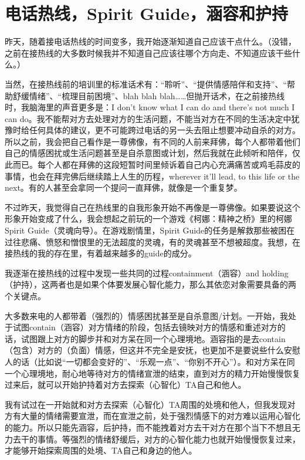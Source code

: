 \chapter{电话热线，Spirit Guide，涵容和护持}


昨天，随着接电话热线的时间变多，我开始逐渐知道自己应该干点什么。（没错，之前在接热线的大多数时候我并不知道自己应该往哪个方向走、不知道应该干些什么。）

当然，在接热线前的培训里的标准话术有：“聆听”、“提供情感陪伴和支持”、“帮助舒缓情绪”、“梳理目前困境”、blah blah blah……但抛开话术，在之前接热线时，我脑海里的声音更多是：I don't know what I can do and there's not much I can do。我不能帮对方去处理对方的生活问题，不能当对方在不同的生活决定中犹豫时给任何具体的建议，更不可能跨过电话的另一头去阻止想要冲动自杀的对方。所以之前，我会把自己看作是一尊佛像，有不同的人前来拜佛，每个人都带着他们自己的情感困扰或生活问题甚至是自杀意图或计划，然后我就在此倾听和陪伴，仅此而已。每个人都在拜佛的这段短暂时间里倾诉着自己内心充满痛苦或鸡毛蒜皮的事情，也会在拜完佛后继续踏上人生的历程，wherever it'll lead, to this life or the next。有的人甚至会拿同一个提问一直拜佛，就像是一个重复梦。

不过昨天，我觉得自己在热线里的自我形象开始不再像是一尊佛像。如果要说这个形象开始变成了什么，我会想起之前玩的一个游戏《柯娜：精神之桥》里的柯娜\pozhehao{}Spirit Guide（灵魂向导）。在游戏剧情里，Spirit Guide的任务是解救那些被困在过往悲痛、愤怒和憎恨里的无法超度的灵魂，有的灵魂甚至不想被超度。我想，在接热线的我的存在里，有着越来越多的guide的成分。

我逐渐在接热线的过程中发现一些共同的过程\pozhehao{}containment（涵容）and holding（护持），这两者也是如果个体要发展心智化能力，那么其依恋对象需要具备的两个关键点。

大多数来电的人都带着（强烈的）情感困扰甚至是自杀意图/计划。一开始，我处于试图contain（涵容）对方情绪的阶段，包括去镜映对方的情感和重述对方的话，试图跟上对方的脚步并和对方呆在同一个心理境地。涵容指的是去contain（包含）对方的（负面）情感，但这并不完全是安抚，也更加不是要说些什么安慰人的话（比如说“一切都会变好的”、“乐观一点”、“你别不开心”）。和对方呆在同一个心理境地，耐心地等待对方的情绪宣泄的结束，直到对方的精力开始慢慢恢复过来后，就可以开始护持着对方去探索（心智化）TA自己和他人。

我有试过在一开始就和对方去探索（心智化）TA周围的处境和他人，但我发现对方有大量的情绪需要宣泄，而在宣泄之前，处于强烈情感下的对方难以运用心智化的能力。所以只能先涵容，后护持，而不能拽着对方去干对方在那个当下不想且无力去干的事情。等强烈的情绪舒缓后，对方的心智化能力也就开始慢慢恢复过来，才能够开始探索周围的处境、TA自己和身边的他人。

